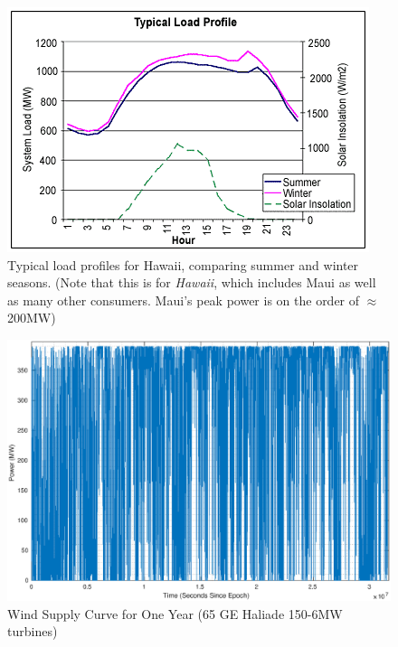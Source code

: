 \begin{figure}[p]
    \centering
    \includegraphics[scale=0.7]{./images/hawaiipower.png}
    \caption{Typical load profiles for Hawaii, comparing summer and winter seasons. \cite{power:loadcurve} (Note that this is for \emph{Hawaii}, which includes Maui as well as many other consumers. Maui's peak power is on the order of $\approx$200MW)}
    \label{fig:hawaiipower}
\end{figure}

\begin{figure}[p]
    \centering
    \includegraphics[scale=0.6]{./images/hawaiiwind.eps}
    \caption{Wind Supply Curve for One Year (65 GE Haliade 150-6MW turbines)}
    \label{fig:windsupply}
\end{figure}

